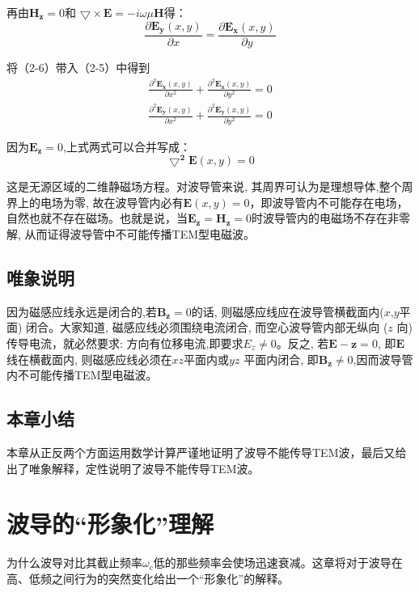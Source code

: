 \documentclass[bachelor]{thesis-uestc}
\begin{document}
再由$\bm{H_z}=0$和 $\bigtriangledown\times\bm{E}=-i\omega\mu\bm{H}$得：
\begin{equation}
	\frac{\partial\bm{E_y}(x,y)}{\partial x}=\frac{\partial\bm{E_x}(x,y)}{\partial y}
\end{equation}

将（2-6）带入（2-5）中得到
\begin{equation}
	\begin{aligned}
	\frac{\partial^2\bm{E_x}(x,y)}{\partial x^2}+\frac{\partial^2\bm{E_x}(x,y)}{\partial y^2}=0\\
	\frac{\partial^2\bm{E_y}(x,y)}{\partial x^2}+\frac{\partial^2\bm{E_y}(x,y)}{\partial y^2}=0
	\end{aligned}
\end{equation}

因为$\bm{E_z}=0$,上式两式可以合并写成：
\begin{equation}
	\bm{\bigtriangledown^2}\bm{E}(x,y)=0
\end{equation}

这是无源区域的二维静磁场方程。对波导管来说, 其周界可认为是理想导体,整个周界上的电场为零, 故在波导管内必有$\bm{E}(x,y)=0$，即波导管内不可能存在电场，自然也就不存在磁场。也就是说，当$\bm{E_z}=\bm{H_z}=0$时波导管内的电磁场不存在非零解, 从而证得波导管中不可能传播TEM型电磁波。

\section{唯象说明}

因为磁感应线永远是闭合的,若$\bm{B_z}=0$的话, 则磁感应线应在波导管横截面内($x$,$y$平面) 闭合。大家知道, 磁感应线必须围绕电流闭合, 而空心波导管内部无纵向 ($z$ 向) 传导电流，就必然要求: 方向有位移电流,即要求$E_z\neq0$。反之, 若$\bm{E-z}=0$, 即$\bm{E}$线在横截面内, 则磁感应线必须在$x$$z$平面内或$y$$z$ 平面内闭合, 即$\bm{B_z}\neq0$,因而波导管内不可能传播TEM型电磁波。
\section{本章小结}

本章从正反两个方面运用数学计算严谨地证明了波导不能传导TEM波，最后又给出了唯象解释，定性说明了波导不能传导TEM波。

\chapter{波导的“形象化”理解}

为什么波导对比其截止频率$\omega _c$低的那些频率会使场迅速衰减。这章将对于波导在高、低频之间行为的突然变化给出一个“形象化”的解释。
\end{document}
